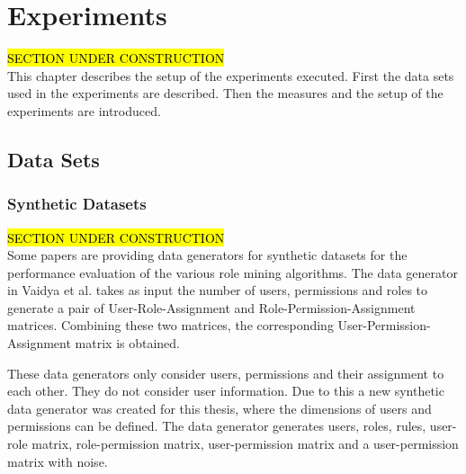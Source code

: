\newpage
\section{Experiments}
\hl{SECTION UNDER CONSTRUCTION}\\
This chapter describes the setup of the experiments executed. First the data sets used in the experiments are described. Then the measures and the setup of the experiments are introduced.

\subsection{Data Sets}
\subsubsection{Synthetic Datasets}
\hl{SECTION UNDER CONSTRUCTION}\\
Some papers are providing data generators for synthetic datasets for the performance evaluation of the various role mining algorithms. The data generator in Vaidya et al.\cite{Vaidya:2006:RMR:1180405.1180424} takes as input the number of users, permissions and roles to generate a pair of User-Role-Assignment and Role-Permission-Assignment matrices. Combining these two matrices, the corresponding User-Permission-Assignment matrix is obtained.
\iffalse In the data generator introduced in [Lu et al. 2014]...\\
"In [Lu et al. 2014], several sets of synthetic data of varying parameters are used. The data gen- erator takes as input the number of users and permissions, density of 1s in the PA, density of 1s in the UA and the noise level to produce the UA and PA matrices."\fi
These data generators only consider users, permissions and their assignment to each other. They do not consider user information. Due to this a new synthetic data generator was created for this thesis, where the dimensions of users and permissions can be defined. The data generator generates users, roles, rules, user-role matrix, role-permission matrix, user-permission matrix and a user-permission matrix with noise.

